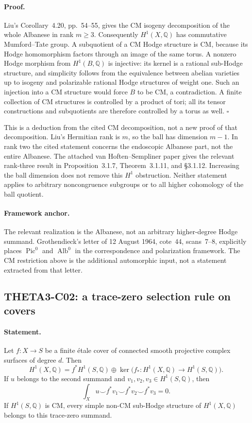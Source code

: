 \documentclass[11pt]{article}
\newcommand{\Q}{\mathbb Q}\newcommand{\C}{\mathbb C}\newcommand{\Z}{\mathbb Z}\newcommand{\R}{\mathbb R}\newcommand{\A}{\mathbb A}\newcommand{\OO}{\mathcal O}
\theoremstyle{definition}\newtheorem{definition}[theorem]{Definition}\newtheorem{remark}[theorem]{Remark}
\begin{document}
\paragraph{Proof.}
Liu's Corollary~4.20, pp.~54--55, gives the CM isogeny decomposition of
the whole Albanese in rank $m\geq3$. Consequently $H^1(X,\Q)$ has
commutative Mumford--Tate group. A subquotient of a CM Hodge structure
is CM, because its Hodge homomorphism factors through an image of the
same torus. A nonzero Hodge morphism from $H^1(B,\Q)$ is injective:
its kernel is a rational sub-Hodge structure, and simplicity follows
from the equivalence between abelian varieties up to isogeny and
polarizable rational Hodge structures of weight one. Such an
injection into a CM structure would force $B$ to be CM, a
contradiction. A finite collection of CM structures is controlled by
a product of tori; all its tensor constructions and subquotients are
therefore controlled by a torus as well. $\square$

This is a deduction from the cited CM decomposition, not a new proof
of that decomposition. Liu's Hermitian rank is $m$, so the ball has
dimension $m-1$. In rank two the cited statement concerns the
endoscopic Albanese part, not the entire Albanese. The attached
van Hoften--Sempliner paper gives the relevant rank-three result in
Proposition~3.1.7, Theorem~3.1.11, and \S3.1.12. Increasing the ball
dimension does not remove this $H^1$ obstruction. Neither statement
applies to arbitrary noncongruence subgroups or to all higher
cohomology of the ball quotient.

\paragraph{Framework anchor.}
The relevant realization is the Albanese, not an arbitrary higher-degree
Hodge summand.  Grothendieck's letter of 12 August 1964, cote~44,
scans~7--8, explicitly places $\operatorname{Pic}^0$ and
$\operatorname{Alb}^0$ in the correspondence and polarization framework.
The CM restriction above is the additional automorphic input, not a
statement extracted from that letter.

\subsection{THETA3-C02: a trace-zero selection rule on covers}\label{C02}

\paragraph{Statement.}
Let $f:X\to S$ be a finite \'etale cover of connected smooth
projective complex surfaces of degree $d$. Then
\[
 H^1(X,\Q)=f^*H^1(S,\Q)\oplus
       \ker\bigl(f_*:H^1(X,\Q)\to H^1(S,\Q)\bigr).
\]
If $u$ belongs to the second summand and $v_1,v_2,v_3\in H^1(S,\Q)$,
then
\[
 \int_Xu\smile f^*v_1\smile f^*v_2\smile f^*v_3=0.
\]
If $H^1(S,\Q)$ is CM, every simple non-CM sub-Hodge structure of
$H^1(X,\Q)$ belongs to this trace-zero summand.
\end{document}
